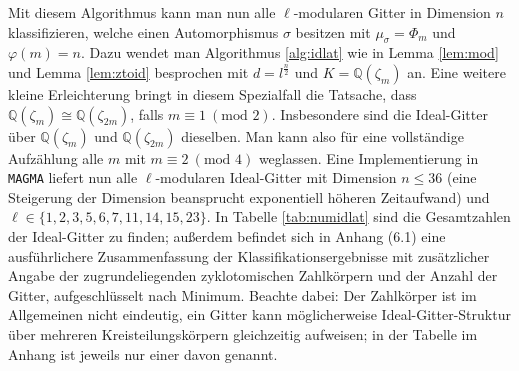 \documentclass[12pt,a4paper,halfparskip,headsepline,bibtotocnumbered]{scrreprt}
\theoremstyle{nummermitklammern}
\theoremstyle{nonumberbreak}
\newcommand{\Q}{\mathbb{Q}}
\begin{document}
Mit diesem Algorithmus kann man nun alle $\ell$-modularen Gitter in Dimension $n$ klassifizieren, welche einen Automorphismus $\sigma$ besitzen mit $\mu_\sigma = \Phi_m$ und $\varphi(m) = n$. Dazu wendet man Algorithmus \eqref{alg:idlat} wie in Lemma \eqref{lem:mod} und Lemma \eqref{lem:ztoid} besprochen mit $d = l^\frac{n}{2}$ und $K = \Q(\zeta_m)$ an. Eine weitere kleine Erleichterung bringt in diesem Spezialfall die Tatsache, dass $\Q(\zeta_m) \cong \Q(\zeta_{2m})$, falls $m \equiv 1\  (\text{mod } 2)$. Insbesondere sind die Ideal-Gitter über $\Q(\zeta_m)$ und $\Q(\zeta_{2m})$ dieselben. Man kann also für eine vollständige Aufzählung alle $m$ mit $m \equiv 2\  (\text{mod } 4)$ weglassen. Eine Implementierung in \texttt{MAGMA} liefert nun alle $\ell$-modularen Ideal-Gitter mit Dimension $n \leq 36$ (eine Steigerung der Dimension beansprucht exponentiell höheren Zeitaufwand) und $\ell \in \lbrace 1,2,3,5,6,7,11,14,15,23 \rbrace$. In Tabelle \eqref{tab:numidlat} sind die Gesamtzahlen der Ideal-Gitter zu finden; außerdem befindet sich in Anhang (6.1) eine ausführlichere Zusammenfassung der Klassifikationsergebnisse mit zusätzlicher Angabe der zugrundeliegenden zyklotomischen Zahlkörpern und der Anzahl der Gitter, aufgeschlüsselt nach Minimum. Beachte dabei: Der Zahlkörper ist im Allgemeinen nicht eindeutig, ein Gitter kann möglicherweise Ideal-Gitter-Struktur über mehreren Kreisteilungskörpern gleichzeitig aufweisen; in der Tabelle im Anhang ist jeweils nur einer davon genannt.
\end{document}
